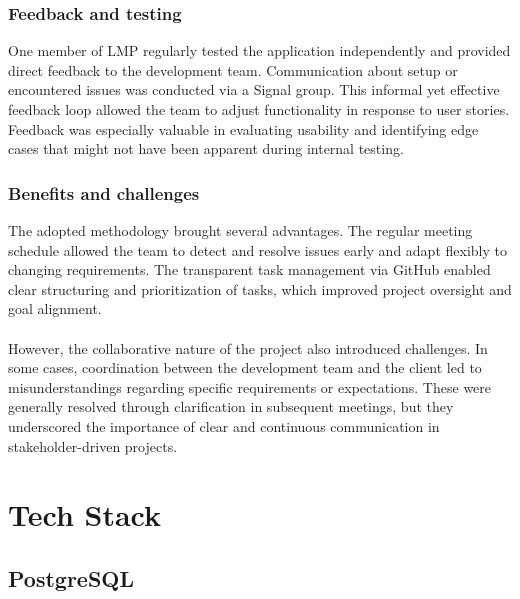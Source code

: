 \documentclass[a4paper,12pt]{report}
\begin{document}
\subsection{Feedback and testing}
One member of LMP regularly tested the application independently and provided direct feedback to the development team. Communication about setup or encountered issues was conducted via a Signal group. This informal yet effective feedback loop allowed the team to adjust functionality in response to user stories. Feedback was especially valuable in evaluating usability and identifying edge cases that might not have been apparent during internal testing. \\

\subsection{Benefits and challenges}
The adopted methodology brought several advantages. The regular meeting schedule allowed the team to detect and resolve issues early and adapt flexibly to changing requirements. The transparent task management via GitHub enabled clear structuring and prioritization of tasks, which improved project oversight and goal alignment.\\\\
However, the collaborative nature of the project also introduced challenges. In some cases, coordination between the development team and the client led to misunderstandings regarding specific requirements or expectations. These were generally resolved through clarification in subsequent meetings, but they underscored the importance of clear and continuous communication in stakeholder-driven projects. 

\chapter{Tech Stack}
\section{PostgreSQL}
\end{document}
